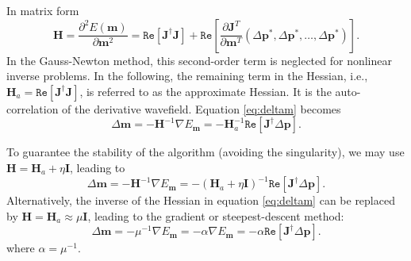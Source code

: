 In matrix form
\begin{equation}\label{eq:descent2}
\textbf{H}=\frac{\partial^2 E(\textbf{m})}{\partial \textbf{m}^2}=\mathtt{Re}\left[\textbf{J}^{\dagger}\textbf{J}\right]+
\mathtt{Re}\left[\frac{\partial \textbf{J}^T}{\partial \textbf{m}^T}(\Delta \textbf{p}^*, \Delta \textbf{p}^*, \ldots, \Delta \textbf{p}^*)\right].
\end{equation}
In the Gauss-Newton method, this second-order term is neglected for nonlinear inverse problems. In the following, the remaining term in the Hessian, i.e., $\textbf{H}_a=\mathtt{Re}[\textbf{J}^{\dagger}\textbf{J}]$, is referred to as the approximate Hessian. It is the auto-correlation of the derivative wavefield. Equation \eqref{eq:deltam} becomes
\begin{equation}
\Delta \textbf{m}
=-\textbf{H}^{-1}\nabla E_{\textbf{m}}
=-\textbf{H}_a^{-1}\mathtt{Re}[\textbf{J}^{\dagger}\Delta \textbf{p}].
\end{equation}

To guarantee the stability of the algorithm (avoiding the singularity), we may use $\textbf{H}=\textbf{H}_a+\eta \textbf{I}$, leading to
\begin{equation}\label{eq:hessian}
\Delta \textbf{m}
=-\textbf{H}^{-1}\nabla E_{\textbf{m}}
=-(\textbf{H}_a+\eta \textbf{I})^{-1}\mathtt{Re}\left[\textbf{J}^{\dagger}\Delta \textbf{p}\right].
\end{equation}
Alternatively, the inverse of the Hessian in equation \eqref{eq:deltam} can be replaced by $ \textbf{H}=\textbf{H}_a\approx\mu \textbf{I}$, leading to the gradient or steepest-descent method:
\begin{equation}
\Delta \textbf{m}
=-\mu^{-1}\nabla E_{\textbf{m}}
=-\alpha\nabla E_{\textbf{m}}
=-\alpha\mathtt{Re}\left[\textbf{J}^{\dagger}\Delta \textbf{p}\right].
\end{equation}
where $\alpha=\mu^{-1}$.

\label{app:derivative}

